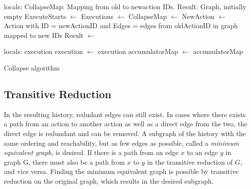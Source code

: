 	\begin{algorithm}
		\begin{algorithmic}
			\State
				locals: CollapseMap: Mapping from old to newaction IDs.
				\State\hspace{28pt} Result: Graph, initially empty
				\State
				\State ExecuteStarts $\leftarrow$  \State
				Executions $\leftarrow$ 
				\State
					CollapseMap $\leftarrow$ 
				\EndFor
					\State
					NewAction $\leftarrow$ Action with \State\hspace{28pt}ID = newActionID and \State\hspace{28pt}Edges = edges from oldActionID in graph mapped to new IDs\State
					Result $\leftarrow$  \State{}
				\EndFor
				
			\EndFunction
			\State
				\State locals: execution
				 \State
					execution $\leftarrow$ 
				\EndWhile\State
				\Return execution
			\EndFunction
			\State
				\State
					accumulatorMap $\leftarrow$ 
				\EndFor \State
				\Return accumulatorMap
			\EndFunction
		\end{algorithmic}
		\caption{Collapse algorithm}
		\label{alg:collapse}
	\end{algorithm}
	
	\subsection{Transitive Reduction}
	\newpar In the resulting history, redudant edges can still exist. In cases where there exists a path from an action to another action as well as a direct edge from the two, the direct edge is redundant and can be removed. A subgraph of the history with the same ordering and reachability, but as few edges as possible, called a \textit{minimum equivalent graph}, is desired. If there is a path from an edge $x$ to an edge $y$ in graph G, there must also be a path from $x$ to $y$ in the transitive reduction of $G$, and vice versa. 
	Finding the minimum equivalent graph is possible by transitive reduction on the original graph, which results in the desired subgraph. 
	
